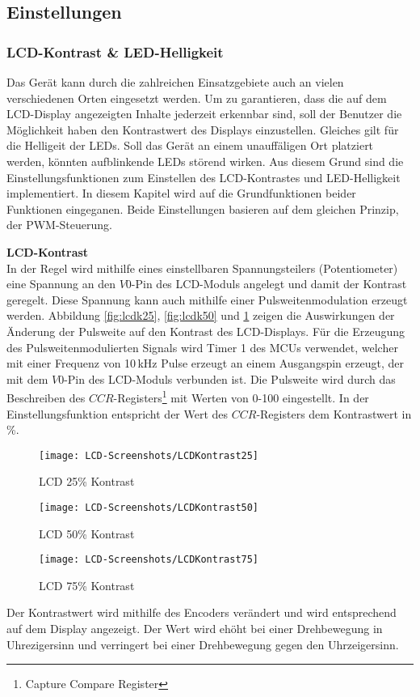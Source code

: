 \subsection{Einstellungen}

\subsubsection{LCD-Kontrast \& LED-Helligkeit}
Das Gerät kann durch die zahlreichen Einsatzgebiete auch an vielen verschiedenen Orten eingesetzt werden. Um zu garantieren, dass die auf dem LCD-Display angezeigten Inhalte jederzeit erkennbar sind, soll der Benutzer die Möglichkeit haben den Kontrastwert des Displays einzustellen. Gleiches gilt für die Helligeit der LEDs. Soll das Gerät an einem unauffäligen Ort platziert werden, könnten aufblinkende LEDs störend wirken. Aus diesem Grund sind die Einstellungsfunktionen zum Einstellen des LCD-Kontrastes und LED-Helligkeit implementiert. In diesem Kapitel wird auf die Grundfunktionen beider Funktionen eingeganen. Beide Einstellungen basieren auf dem gleichen Prinzip, der PWM-Steuerung. 

\textbf{LCD-Kontrast}\\
In der Regel wird mithilfe eines einstellbaren Spannungsteilers (Potentiometer) eine Spannung an den $V0$-Pin des LCD-Moduls angelegt und damit der Kontrast geregelt. Diese Spannung kann auch mithilfe einer Pulsweitenmodulation erzeugt werden. Abbildung \ref{fig:lcdk25}, \ref{fig:lcdk50} und \ref{fig:lcdk75} zeigen die Auswirkungen der Änderung der Pulsweite auf den Kontrast des LCD-Displays. Für die Erzeugung des Pulsweitenmodulierten Signals wird Timer 1 des MCUs verwendet, welcher mit einer Frequenz von 10\,kHz Pulse erzeugt an einem Ausgangspin erzeugt, der mit dem $V0$-Pin des LCD-Moduls verbunden ist. Die Pulsweite wird durch das Beschreiben des $CCR$-Registers\footnote{Capture Compare Register} mit Werten von 0-100 eingestellt. In der Einstellungsfunktion entspricht der Wert des $CCR$-Registers dem Kontrastwert in \%.
\begin{figure}[h]
	\begin{minipage}{.3\linewidth}
		\centering
		\texttt{[image: LCD-Screenshots/LCDKontrast25]}
		\caption{LCD 25\% Kontrast}
		\label{fig:lcdk25}
	\end{minipage}
	\hfill
	\begin{minipage}{.3\linewidth}
		\centering
		\texttt{[image: LCD-Screenshots/LCDKontrast50]}
		\caption{LCD 50\% Kontrast}
		\label{fig:lcdk50}
	\end{minipage}
	\hfill
	\begin{minipage}{.3\linewidth}
		\centering
		\texttt{[image: LCD-Screenshots/LCDKontrast75]}
		\caption{LCD 75\% Kontrast}
		\label{fig:lcdk75}
	\end{minipage}
	\hfill
\end{figure}
Der Kontrastwert wird mithilfe des Encoders verändert und wird entsprechend auf dem Display angezeigt. Der Wert wird ehöht bei einer Drehbewegung in Uhrezigersinn und verringert bei einer Drehbewegung gegen den Uhrzeigersinn.

